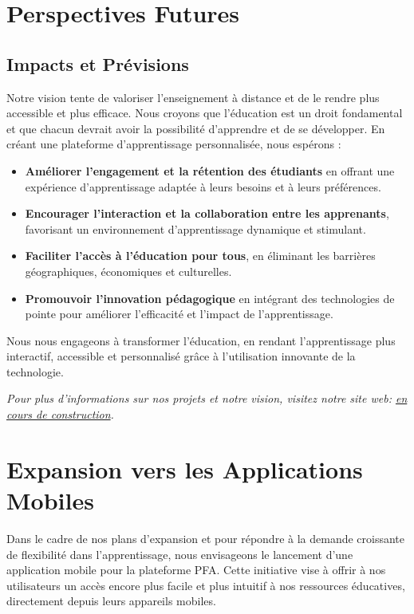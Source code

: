 \section{Perspectives Futures}
\subsection{\textbf{Impacts et Prévisions}}

Notre vision tente de valoriser l'enseignement à distance et de le rendre plus accessible et plus efficace. Nous croyons que l'éducation est un droit fondamental et que chacun devrait avoir la possibilité d'apprendre et de se développer. En créant une plateforme d'apprentissage personnalisée, nous espérons :

\begin{itemize}[leftmargin=*,label=\textbullet]
\item \textbf{Améliorer l'engagement et la rétention des étudiants} en offrant une expérience d'apprentissage adaptée à leurs besoins et à leurs préférences.
\item \textbf{Encourager l'interaction et la collaboration entre les apprenants}, favorisant un environnement d'apprentissage dynamique et stimulant.
\item \textbf{Faciliter l'accès à l'éducation pour tous}, en éliminant les barrières géographiques, économiques et culturelles.
\item \textbf{Promouvoir l'innovation pédagogique} en intégrant des technologies de pointe pour améliorer l'efficacité et l'impact de l'apprentissage.
\end{itemize}

\begin{tcolorbox}[colback=gray!20,colframe=black,width=\linewidth,arc=2mm,auto outer arc,
                  title=\textbf{Notre Engagement:}]
Nous nous engageons à transformer l'éducation, en rendant l'apprentissage plus interactif, accessible et personnalisé grâce à l'utilisation innovante de la technologie.
\end{tcolorbox}

\textit{Pour plus d'informations sur nos projets et notre vision, visitez notre site web: \href{http://www.pfa-education.com}{en cours de construction}.} 
\vfill

\section{Expansion vers les Applications Mobiles}
Dans le cadre de nos plans d'expansion et pour répondre à la demande croissante de flexibilité dans l'apprentissage, nous envisageons le lancement d'une application mobile pour la plateforme PFA. Cette initiative vise à offrir à nos utilisateurs un accès encore plus facile et plus intuitif à nos ressources éducatives, directement depuis leurs appareils mobiles.

